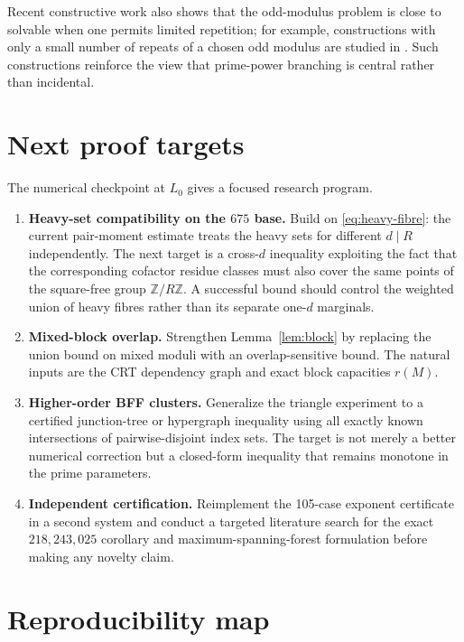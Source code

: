 \documentclass[11pt]{article}
\theoremstyle{definition}
\newcommand{\Z}{\mathbb Z}
\begin{document}
Recent constructive work also shows that the odd-modulus problem is close to solvable when one
permits limited repetition; for example, constructions with only a small number of repeats of a
chosen odd modulus are studied in \cite{Bispels2025}.  Such constructions reinforce the view
that prime-power branching is central rather than incidental.

\section{Next proof targets}

The numerical checkpoint at $L_0$ gives a focused research program.

\begin{enumerate}[label=\arabic*.]
\item \textbf{Heavy-set compatibility on the $675$ base.}  Build on
\eqref{eq:heavy-fibre}: the current pair-moment estimate treats the heavy sets for different
$d\mid R$ independently.  The next target is a cross-$d$ inequality exploiting the fact that the
corresponding cofactor residue classes must also cover the same points of the square-free group
$\Z/R\Z$.  A successful bound should control the weighted union of heavy fibres rather than its
separate one-$d$ marginals.

\item \textbf{Mixed-block overlap.}  Strengthen Lemma~\ref{lem:block} by replacing the union
bound on mixed moduli with an overlap-sensitive bound.  The natural inputs are the CRT
dependency graph and exact block capacities $r(M)$.

\item \textbf{Higher-order BFF clusters.}  Generalize the triangle experiment to a certified
junction-tree or hypergraph inequality using all exactly known intersections of pairwise-disjoint
index sets.  The target is not merely a better numerical correction but a closed-form inequality
that remains monotone in the prime parameters.

\item \textbf{Independent certification.}  Reimplement the 105-case exponent certificate in a
second system and conduct a targeted literature search for the exact $218{,}243{,}025$ corollary
and maximum-spanning-forest formulation before making any novelty claim.
\end{enumerate}

\section{Reproducibility map}
\end{document}
